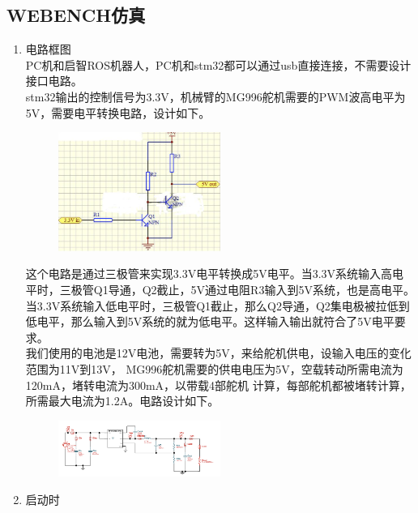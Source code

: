 \documentclass[11pt]{article}
\begin{document}
\subsection{WEBENCH仿真}
\begin{enumerate}[$\bullet$]
    \item 电路框图\\
    PC机和启智ROS机器人，PC机和stm32都可以通过usb直接连接，不需要设计接口电路。\\
stm32输出的控制信号为3.3V，机械臂的MG996舵机需要的PWM波高电平为5V，需要电平转换电路，设计如下。
\begin{figure}[H] %
    \centering %
    \includegraphics[width=0.5\textwidth]{12.PNG} %
\end{figure}
这个电路是通过三极管来实现3.3V电平转换成5V电平。当3.3V系统输入高电平时，三极管Q1导通，Q2截止，5V通过电阻R3输入到5V系统，也是高电平。当3.3V系统输入低电平时，三极管Q1截止，那么Q2导通，Q2集电极被拉低到低电平，那么输入到5V系统的就为低电平。这样输入输出就符合了5V电平要求。\\
我们使用的电池是12V电池，需要转为5V，来给舵机供电，设输入电压的变化范围为11V到13V， MG996舵机需要的供电电压为5V，空载转动所需电流为120mA，堵转电流为300mA，以带载4部舵机 计算，每部舵机都被堵转计算，所需最大电流为1.2A。电路设计如下。
\begin{figure}[H] %
    \centering %
    \includegraphics[width=0.5\textwidth]{13.PNG} %
\end{figure}
    \item 启动时\\
    \begin{figure}[H] %

\end{figure}
\end{enumerate}
\end{document}

